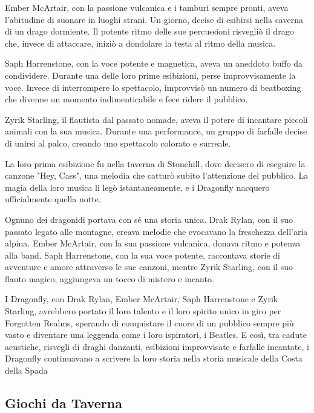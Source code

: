 \documentclass{article}
\begin{document}
Ember McArtair, con la passione vulcanica e i tamburi sempre pronti, aveva l'abitudine di suonare in luoghi strani. Un giorno, decise di esibirsi nella caverna di un drago dormiente. Il potente ritmo delle sue percussioni risvegliò il drago che, invece di attaccare, iniziò a dondolare la testa al ritmo della musica.

Saph Harrenstone, con la voce potente e magnetica, aveva un aneddoto buffo da condividere. Durante una delle loro prime esibizioni, perse improvvisamente la voce. Invece di interrompere lo spettacolo, improvvisò un numero di beatboxing che divenne un momento indimenticabile e fece ridere il pubblico.

Zyrik Starling, il flautista dal passato nomade, aveva il potere di incantare piccoli animali con la sua musica. Durante una performance, un gruppo di farfalle decise di unirsi al palco, creando uno spettacolo colorato e surreale.

La loro prima esibizione fu nella taverna di Stonehill, dove decisero di eseguire la canzone "Hey, Cass", una melodia che catturò subito l'attenzione del pubblico. La magia della loro musica li legò istantaneamente, e i Dragonfly nacquero ufficialmente quella notte.

Ognuno dei dragonidi portava con sé una storia unica. Drak Rylan, con il suo passato legato alle montagne, creava melodie che evocavano la freschezza dell'aria alpina. Ember McArtair, con la sua passione vulcanica, donava ritmo e potenza alla band. Saph Harrenstone, con la sua voce potente, raccontava storie di avventure e amore attraverso le sue canzoni, mentre Zyrik Starling, con il suo flauto magico, aggiungeva un tocco di mistero e incanto.

I Dragonfly, con Drak Rylan, Ember McArtair, Saph Harrenstone e Zyrik Starling, avrebbero portato il loro talento e il loro spirito unico in giro per Forgotten Realms, sperando di conquistare il cuore di un pubblico sempre più vasto e diventare una leggenda come i loro ispiratori, i Beatles. E così, tra cadute acustiche, risvegli di draghi danzanti, esibizioni improvvisate e farfalle incantate, i Dragonfly continuavano a scrivere la loro storia nella storia musicale della Costa della Spada







          \subsection{Giochi da Taverna}
\end{document}
